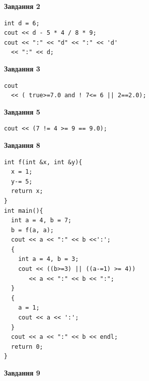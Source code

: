 \documentclass[12pt, ukrainian]{article}
\begin{document}
{\begin {large}
\begin{minipage}[t]{7.0cm}
\end{minipage}
\vline \hspace{1mm}
\begin{minipage}[t]{11.0cm}

\begin{center}
\textbf{Завдання 2}
\end{center}
\vspace{-8mm}

\begin{verbatim}
int d = 6;
cout << d - 5 * 4 / 8 * 9;
cout << ":" << "d" << ":" << 'd' 
  << ":" << d;
\end{verbatim}



\begin{center}
\textbf{Завдання 3}
\end{center}
\vspace{-8mm}

\begin{verbatim}
cout 
  << ( true>=7.0 and ! 7<= 6 || 2==2.0);
\end{verbatim}



\begin{center}
\textbf{Завдання 5}
\end{center}
\vspace{-8mm}

\begin{verbatim}
cout << (7 != 4 >= 9 == 9.0);
\end{verbatim}



\begin{center}
\textbf{Завдання 8}
\end{center}
\vspace{-8mm}

\begin{verbatim}
int f(int &x, int &y){
  x = 1;
  y-= 5;
  return x;
}
int main(){
  int a = 4, b = 7;
  b = f(a, a);
  cout << a << ":" << b <<':';
  {
    int a = 4, b = 3;
    cout << ((b>=3) || ((a-=1) >= 4))
       << a << ":" << b << ":";
  }
  {
    a = 1;
    cout << a << ':';
  }
  cout << a << ":" << b << endl;
  return 0;
}
\end{verbatim}

\end{minipage}


\begin{minipage}[t]{7.0cm}

\begin{center}
\textbf{Завдання 9}
\end{center}
\vspace{-8mm}


\end{minipage}
\end{large}}
\end{document}
